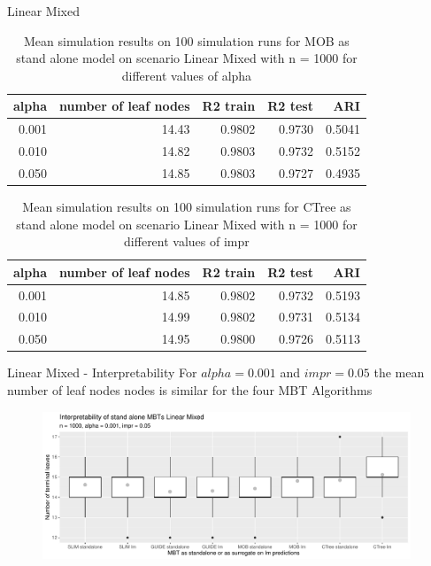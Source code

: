 \documentclass[9pt, xcolor=table]{beamer}
\begin{document}
\begin{frame}{Linear Mixed}
\begin{table}

\caption{Mean simulation results on 100 simulation runs for MOB as stand alone model on scenario Linear Mixed with n = 1000 for different values of alpha }
\centering
\begin{tabular}[t]{r|r|r|r|r}
\hline
alpha & number of leaf nodes & R2 train & R2 test & ARI\\
\hline
0.001 & 14.43 & 0.9802 & 0.9730 & 0.5041\\
\hline
0.010 & 14.82 & 0.9803 & 0.9732 & 0.5152\\
\hline
0.050 & 14.85 & 0.9803 & 0.9727 & 0.4935\\
\hline
\end{tabular}
\end{table}

\begin{table}

\caption{Mean simulation results on 100 simulation runs for CTree as stand alone model on scenario Linear Mixed with n = 1000 for different values of impr }
\centering
\begin{tabular}[t]{r|r|r|r|r}
\hline
alpha & number of leaf nodes & R2 train & R2 test & ARI\\
\hline
0.001 & 14.85 & 0.9802 & 0.9732 & 0.5193\\
\hline
0.010 & 14.99 & 0.9802 & 0.9731 & 0.5134\\
\hline
0.050 & 14.95 & 0.9800 & 0.9726 & 0.5113\\
\hline
\end{tabular}
\end{table}
    
\end{frame}

\begin{frame}{Linear Mixed - Interpretability}
For  $alpha= 0.001$ and $impr = 0.05$ the mean number of leaf nodes nodes is similar for the four MBT Algorithms
\begin{figure}
    \includegraphics[width=11cm]{Figures/simulations/batchtools/basic_scenarios/linear_mixed/lm_1000_standalone_lm_int.pdf}
\end{figure}     
\end{frame}
\end{document}
